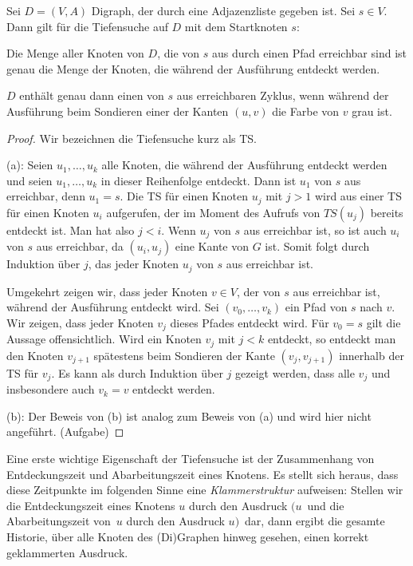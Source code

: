 \begin{thm} \label{thm:erreichbarkeit:ts} 
	Sei $D=(V,A)$ Digraph, der durch eine Adjazenzliste gegeben ist. Sei $s \in V$. Dann gilt für die Tiefensuche auf $D$ mit dem Startknoten $s$:
	\begin{enuma}
		\item Die Menge aller Knoten von $D$, die von $s$ aus durch einen Pfad erreichbar sind ist genau die Menge der Knoten, die während der Ausführung entdeckt werden. 
		\item $D$ enthält genau dann einen von $s$ aus erreichbaren Zyklus, wenn während der Ausführung beim Sondieren einer der Kanten $(u,v)$ die Farbe von $v$ grau ist. 
	\end{enuma} 
\end{thm}
\begin{proof}
	Wir bezeichnen die Tiefensuche kurz als TS.
		
	\condclearpage 
	
	(a): Seien $u_1,\ldots,u_k$ alle Knoten, die während der Ausführung entdeckt werden und seien $u_1,\ldots,u_k$ in dieser Reihenfolge entdeckt. Dann ist $u_1$ von $s$ aus erreichbar, denn $u_1=s$. Die TS für einen Knoten $u_j$ mit $j > 1$ wird aus einer TS für einen Knoten $u_i$ aufgerufen, der im Moment des Aufrufs von $TS(u_j)$ bereits entdeckt ist. Man hat also $j< i$. Wenn $u_j$ von $s$ aus erreichbar ist, so ist auch $u_i$ von $s$ aus erreichbar, da $(u_i,u_j)$ eine Kante von $G$ ist. Somit folgt durch Induktion über $j$, das jeder Knoten $u_j$ von $s$ aus erreichbar ist. 
	
	\condclearpage 
	
	Umgekehrt zeigen wir, dass jeder Knoten $v \in V$, der von $s$ aus erreichbar ist, während der Ausführung entdeckt wird. Sei $(v_0,\ldots,v_k)$ ein Pfad von $s$ nach $v$. Wir zeigen, dass jeder Knoten $v_j$ dieses Pfades entdeckt wird. Für $v_0=s$ gilt die Aussage offensichtlich. Wird ein Knoten $v_j$ mit $j < k$ entdeckt, so entdeckt man den Knoten $v_{j+1}$ spätestens beim Sondieren der Kante $(v_j,v_{j+1})$ innerhalb der TS für $v_j$. Es kann als durch Induktion über $j$ gezeigt werden, dass alle $v_j$ und insbesondere auch $v_k=v$ entdeckt werden.
	
	\condclearpage 
	
	(b): Der Beweis von (b) ist analog zum Beweis von (a) und wird hier nicht angeführt. (Aufgabe)
\end{proof}


\begin{bem}
Eine erste wichtige Eigenschaft der Tiefensuche ist der Zusammenhang von Entdeckungszeit und Abarbeitungszeit eines Knotens.
Es stellt sich heraus, dass diese Zeitpunkte im folgenden Sinne eine \emph{Klammerstruktur} aufweisen:
Stellen wir die Entdeckungszeit eines Knotens $u$ durch den Ausdruck \glqq $(u$\grqq\ und die Abarbeitungszeit von~$u$ durch den Ausdruck \glqq $u)$\grqq\ dar, dann ergibt die gesamte Historie, über alle Knoten des (Di)Graphen hinweg gesehen, einen korrekt geklammerten Ausdruck.
\end{bem} 

